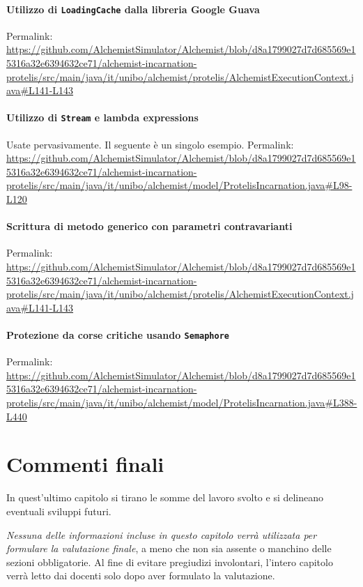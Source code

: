 \documentclass[a4paper,12pt]{report}
\begin{document}
\subsubsection{Utilizzo di \texttt{LoadingCache} dalla libreria Google Guava}

Permalink: \url{https://github.com/AlchemistSimulator/Alchemist/blob/d8a1799027d7d685569e15316a32e6394632ce71/alchemist-incarnation-protelis/src/main/java/it/unibo/alchemist/protelis/AlchemistExecutionContext.java#L141-L143}

\subsubsection{Utilizzo di \texttt{Stream} e lambda expressions}

Usate pervasivamente. Il seguente è un singolo esempio.
Permalink: \url{https://github.com/AlchemistSimulator/Alchemist/blob/d8a1799027d7d685569e15316a32e6394632ce71/alchemist-incarnation-protelis/src/main/java/it/unibo/alchemist/model/ProtelisIncarnation.java#L98-L120}

\subsubsection{Scrittura di metodo generico con parametri contravarianti}

Permalink: \url{https://github.com/AlchemistSimulator/Alchemist/blob/d8a1799027d7d685569e15316a32e6394632ce71/alchemist-incarnation-protelis/src/main/java/it/unibo/alchemist/protelis/AlchemistExecutionContext.java#L141-L143}

\subsubsection{Protezione da corse critiche usando \texttt{Semaphore}}

Permalink: \url{https://github.com/AlchemistSimulator/Alchemist/blob/d8a1799027d7d685569e15316a32e6394632ce71/alchemist-incarnation-protelis/src/main/java/it/unibo/alchemist/model/ProtelisIncarnation.java#L388-L440}


\chapter{Commenti finali}

In quest'ultimo capitolo si tirano le somme del lavoro svolto e si delineano eventuali sviluppi
futuri.

\textit{Nessuna delle informazioni incluse in questo capitolo verrà utilizzata per formulare la valutazione finale}, a meno che non sia assente o manchino delle sezioni obbligatorie.
%
Al fine di evitare pregiudizi involontari, l'intero capitolo verrà letto dai docenti solo dopo aver formulato la valutazione.
\end{document}
